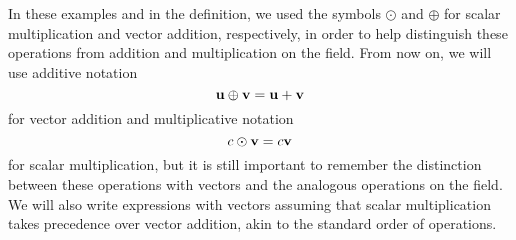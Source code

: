 In these examples and in the definition, we used the symbols $ \odot $ and $ \oplus $ for scalar multiplication and vector addition, respectively, in order to help distinguish these operations from addition and multiplication on the field. From now on, we will use additive notation
\begin{equation*}
    \mathbf{u}\oplus\mathbf{v}=\mathbf{u}+\mathbf{v}
\end{equation*}
for vector addition and multiplicative notation
\begin{equation*}
    c\odot\mathbf{v}=c\mathbf{v}
\end{equation*}
for scalar multiplication, but it is still important to remember the distinction between these operations with vectors and the analogous operations on the field. We will also write expressions with vectors assuming that scalar multiplication takes precedence over vector addition, akin to the standard order of operations.

